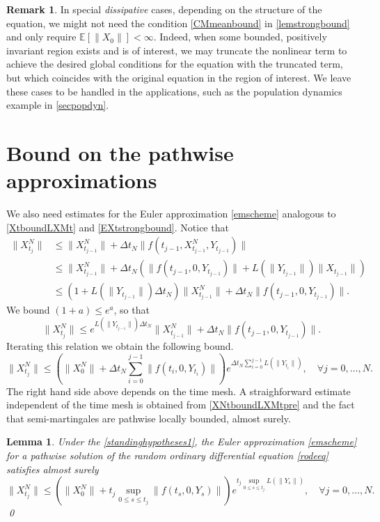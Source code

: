 \documentclass[reqno,12pt]{amsart}
\theoremstyle{plain} %
\newtheorem{lemma}{Lemma}[section]
\theoremstyle{definition} %
\newtheorem{remark}{Remark}[section]
\begin{document}
\begin{remark}
    In special \emph{dissipative} cases, depending on the structure of the equation, we might not need the condition \eqref{CMmeanbound} in \cref{lemstrongbound} and only require $\mathbb{E}[\|X_0\|] < \infty$. Indeed, when some bounded, positively invariant region exists and is of interest, we may truncate the nonlinear term to achieve the desired global conditions for the equation with the truncated term, but which coincides with the original equation in the region of interest. We leave these cases to be handled in the applications, such as the population dynamics example in \cref{secpopdyn}.
\end{remark}

\section{Bound on the pathwise approximations}
\label{secpathwiseapproximation}

We also need estimates for the Euler approximation \eqref{emscheme} analogous to \eqref{XtboundLXMt} and \eqref{EXtstrongbound}. Notice that
\begin{align*}
    \|X_{t_j}^N\| & \leq \|X_{t_{j-1}}^N\| + \Delta t_N \|f(t_{j-1}, X_{t_{j-1}}^N, Y_{t_{j-1}})\| \\
    & \leq \|X_{t_{j-1}}^N\| + \Delta t_N (\|f(t_{j-1}, 0, Y_{t_{j-1}})\| + L(\|Y_{t_{j-1}}\|)\|X_{t_{j-1}}\|) \\
    & \leq \left(1 + L(\|Y_{t_{j-1}}\|)\Delta t_N\right)\|X_{t_{j-1}}^N\| + \Delta t_N \|f(t_{j-1},0,Y_{t_{j-1}})\|.
\end{align*}
We bound $(1 + a) \leq e^a$, so that
\[
    \|X_{t_j}^N\| \leq e^{L(\|Y_{t_{j-1}}\|)\Delta t_N}\|X_{t_{j-1}}^N\| + \Delta t_N \|f(t_{j-1},0,Y_{t_{j-1}})\|.
\]
Iterating this relation we obtain the following bound.
\begin{equation}
    \label{XNtboundLXMtpre}
    \|X_{t_j}^N\| \leq \left(\|X_0^N\| + \Delta t_N \sum_{i=0}^{j-1} \|f(t_i,0,Y_{t_i})\|\right)e^{\Delta t_N \sum_{i=0}^{j-1} L(\|Y_{t_i}\|)}, \quad \forall j = 0, \ldots, N.
\end{equation}
The right hand side above depends on the time mesh. A straighforward estimate independent of the time mesh is obtained from \eqref{XNtboundLXMtpre} and the fact that semi-martingales are pathwise locally bounded, almost surely.
\begin{lemma}
    \label{lemXNtboundLXMt}
    Under the \cref{standinghypotheses1}, the Euler approximation \eqref{emscheme} for a pathwise solution of the random ordinary differential equation \eqref{rodeeq} satisfies almost surely
    \begin{equation}
        \label{XNtboundLXMt}
        \|X_{t_j}^N\| \leq \left(\|X_0^N\| + t_j \sup_{0\leq s\leq t_j} \|f(t_s,0,Y_s)\|\right)e^{t_j \sup_{0\leq s\leq t_j} L(\|Y_s\|)}, \quad \forall j = 0, \ldots, N.
    \end{equation}
    \qed
\end{lemma}
\end{document}
